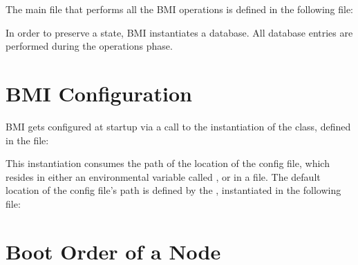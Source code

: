 The main file that performs all the BMI operations is defined in the following file: %

\begin{center}
\end{center}

In order to preserve a state, BMI instantiates a database.  All database entries are performed during the operations phase. \\

\section{BMI Configuration}

BMI gets configured at startup via a call to the instantiation of the \emph{} class, defined in the  file:

\begin{center}
\end{center}


This instantiation consumes the path of the location of the config file, which resides in either an environmental variable called , or in a file.  The default location of the config file's path  is defined by the , instantiated in the following file:

\begin{center}
\end{center}


\section{Boot Order of a Node}

